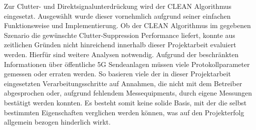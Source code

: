 Zur Clutter- und Direktsignalunterdrückung wird der CLEAN Algorithmus eingesetzt. Ausgewählt wurde dieser vornehmlich aufgrund seiner einfachen Funktionsweise und Implementierung. Ob der CLEAN Algorithmus im gegebenen Szenario die gewünschte Clutter-Suppression Performance liefert, konnte aus zeitlichen Gründen nicht hinreichend innerhalb dieser Projektarbeit evaluiert werden. Hierfür sind weitere Analysen notwendig. Aufgrund der beschränkten Informationen über öffentliche 5G Sendeanlagen müssen viele Protokollparameter gemessen oder erraten werden. So basieren viele der in dieser Projektarbeit eingesetzten Verarbeitungsschritte auf Annahmen, die nicht mit dem Betreiber abgesprochen oder, aufgrund fehlendem Messequipments, durch eigene Messungen bestätigt werden konnten. Es besteht somit keine solide Basis, mit der die selbst bestimmten Eigenschaften verglichen werden können, was auf den Projekterfolg allgemein bezogen hinderlich wirkt.
